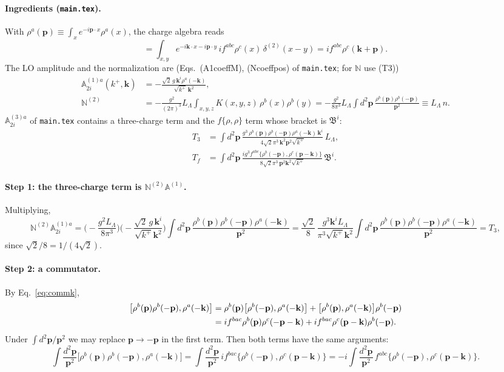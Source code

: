 \documentclass[10pt]{article}
\numberwithin{equation}{section}
\newcommand{\bk}{\mathbf k}
\newcommand{\bp}{\mathbf p}
\begin{document}
\paragraph{Ingredients (\texttt{main.tex}).} With $\rho^a(\bp)\equiv\int_xe^{-i\bp\cdot x}\rho^a(x)$, the charge algebra reads
\begin{equation}
[\rho^a(\bk),\rho^b(\bp)]=\int_{x,y}e^{-i\bk\cdot x-i\bp\cdot y}\,if^{abc}\rho^c(x)\,\delta^{(2)}(x-y)=if^{abc}\rho^c(\bk+\bp).
\label{eq:commk}
\end{equation}
The LO amplitude and the normalization are (Eqs.~(A1coeffM), (Ncoeffpos) of \texttt{main.tex}; for $\mathbb N$ use (T3))
\begin{align}
\mathbb A^{(1)a}_{2i}(k^+,\bk)&=-\frac{\sqrt2\,g\,\bk^i\rho^a(-\bk)}{\sqrt{k^+}\,\bk^2},\\
\mathbb N^{(2)}&=-\frac{g^2}{(2\pi)^3}L_\Lambda\int_{x,y,z}K(x,y,z)\,\rho^b(x)\rho^b(y)=-\frac{g^2}{8\pi^3}L_\Lambda\int d^2\bp\,\frac{\rho^b(\bp)\rho^b(-\bp)}{\bp^2}\equiv L_\Lambda\,n .
\end{align}
$\mathbb A^{(3)a}_{2i}$ of \texttt{main.tex} contains a three-charge term and the $f\{\rho,\rho\}$ term whose bracket is $\mathfrak B^i$:
\begin{align}
T_3&=\int d^2\bp\,\frac{g^3\,\rho^b(\bp)\rho^b(-\bp)\rho^a(-\bk)\,\bk^i}{4\sqrt2\pi^3\,\bk^2\bp^2\sqrt{k^+}}\,L_\Lambda,\\
T_f&=\int d^2\bp\,\frac{ig^3f^{abc}\{\rho^b(-\bp),\rho^c(\bp-\bk)\}}{8\sqrt2\pi^3\,\bp^2\bk^2\sqrt{k^+}}\,\mathfrak B^i .
\end{align}
\paragraph{Step 1: the three-charge term is $\mathbb N^{(2)}\mathbb A^{(1)}$.} Multiplying,
\begin{equation}
\mathbb N^{(2)}\mathbb A^{(1)a}_{2i}=\Big(-\frac{g^2L_\Lambda}{8\pi^3}\Big)\Big(-\frac{\sqrt2\,g\,\bk^i}{\sqrt{k^+}\bk^2}\Big)\int d^2\bp\,\frac{\rho^b(\bp)\rho^b(-\bp)\rho^a(-\bk)}{\bp^2}
=\frac{\sqrt2}{8}\,\frac{g^3\bk^iL_\Lambda}{\pi^3\sqrt{k^+}\bk^2}\int d^2\bp\,\frac{\rho^b(\bp)\rho^b(-\bp)\rho^a(-\bk)}{\bp^2}=T_3,
\end{equation}
since $\sqrt2/8=1/(4\sqrt2)$.
\paragraph{Step 2: a commutator.} By Eq.~\eqref{eq:commk},
\begin{align}
\big[\rho^b(\bp)\rho^b(-\bp),\rho^a(-\bk)\big]&=\rho^b(\bp)\big[\rho^b(-\bp),\rho^a(-\bk)\big]+\big[\rho^b(\bp),\rho^a(-\bk)\big]\rho^b(-\bp)\notag\\
&=if^{bac}\rho^b(\bp)\rho^c(-\bp-\bk)+if^{bac}\rho^c(\bp-\bk)\rho^b(-\bp).
\end{align}
Under $\int d^2\bp/\bp^2$ we may replace $\bp\to-\bp$ in the first term. Then both terms have the same arguments:
\begin{equation}
\int\frac{d^2\bp}{\bp^2}\big[\rho^b(\bp)\rho^b(-\bp),\rho^a(-\bk)\big]=\int\frac{d^2\bp}{\bp^2}\,if^{bac}\big\{\rho^b(-\bp),\rho^c(\bp-\bk)\big\}=-i\int\frac{d^2\bp}{\bp^2}\,f^{abc}\big\{\rho^b(-\bp),\rho^c(\bp-\bk)\big\}.
\end{equation}
\end{document}
